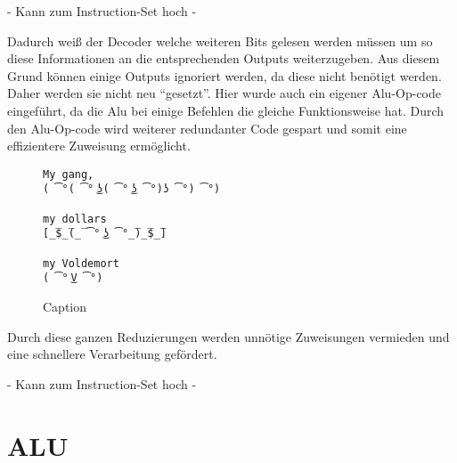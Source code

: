 \documentclass[paper=a4,fontsize=12pt,twocolumn]{scrreprt}
\begin{document}
{\color{green}- Kann zum Instruction-Set hoch - }


Dadurch weiß der Decoder welche weiteren Bits gelesen werden müssen um so diese Informationen an die entsprechenden Outputs weiterzugeben.
Aus diesem Grund können einige Outputs ignoriert werden, da diese nicht benötigt werden.
Daher werden sie nicht neu \enquote{gesetzt}.
Hier wurde auch ein eigener Alu-Op-code eingeführt, da die Alu bei einige Befehlen die gleiche Funktionsweise hat.
Durch den Alu-Op-code wird weiterer redundanter Code gespart und somit eine effizientere Zuweisung ermöglicht.


\begin{figure}
    \centering
    \begin{lstlisting}
My gang,
( ͡°( ͡° ͜ʖ( ͡° ͜ʖ ͡°)ʖ ͡°) ͡°)

my dollars
[̲̅$̲̅(̲̅ ͡° ͜ʖ ͡°̲̅)̲̅$̲̅]

my Voldemort
( ͡° ͜V ͡°)
    \end{lstlisting}
    \caption{Caption}
    \label{fig:my_label}
\end{figure}

Durch diese ganzen Reduzierungen werden unnötige Zuweisungen vermieden und eine schnellere Verarbeitung gefördert.

{\color{green}- Kann zum Instruction-Set hoch - }



\section{ALU}
\end{document}
